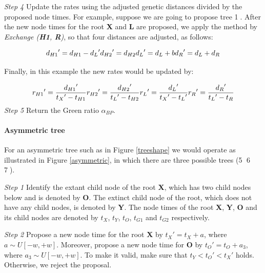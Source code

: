 \documentclass{bmcart}
\begin{document}
\emph{Step 4}  Update the rates using the adjusted genetic distances divided by the proposed node times. For example, suppose we are going to propose tree \textcircled1. After the new node times for the root \textbf{X} and \textbf{L} are proposed, we apply the method by \textit{Exchange (\textbf{H1}, \textbf{R})}, so that four distances are adjusted, as follows:

\begin{equation}\label{example1.1}
{d_{H1}}' = {d_{H1}} - {d_L}'  \\
{d_{H2}}' = {d_{H2}} \\
{d_L}' = {d_L} + b \\
{d_R}' = {d_L} + {d_R}
\end{equation}

Finally, in this example the new rates would be updated by:

\begin{equation}\label{example1.2}
{r_{H1}}' = \frac{{{d_{H1}}'}}{{{t_X}' - {t_{H1}}}} \\
{r_{H2}}' = \frac{{{d_{H2}}'}}{{{t_L}' - {t_{H2}}}} \\
{r_L}' = \frac{{{d_L}'}}{{{t_X}' - {t_L}'}} \\
{r_R}' = \frac{{{d_R}'}}{{{t_L}' - {t_R}}}
\end{equation}
\emph{Step 5} Return the Green ratio ${\alpha_{BP}}$.
\paragraph*{Asymmetric tree}

For an asymmetric tree such as in Figure \ref{treeshape} we would operate as illustrated in Figure \ref{asymmetric}, in which there are three possible trees (\textcircled5 \textcircled6 \textcircled7).

\emph{Step 1} Identify the extant child node of the root \textbf{X}, which has two child nodes below and is denoted by \textbf{O}. The extinct child node of the root, which does not have any child nodes, is denoted by \textbf{Y}. The node times of the root \textbf{X},  \textbf{Y}, \textbf{O} and its child nodes are denoted by ${t_X}$, ${t_Y}$, ${t_O}$, ${t_{G1}}$ and ${t_{G2}}$ respectively.

\emph{Step 2} Propose a new node time for the root \textbf{X} by ${t_X}' = {t_X} + a$, where $a \sim U[ - w, + w]$. Moreover, propose a new node time for \textbf{O} by ${t_O}' = {t_O} + {a_3}$, where ${a_3} \sim U[ - w, + w]$. To make it valid, make sure that ${t_Y} < {t_O}' < {t_X}'$ holds. Otherwise, we reject the proposal.
\end{document}
